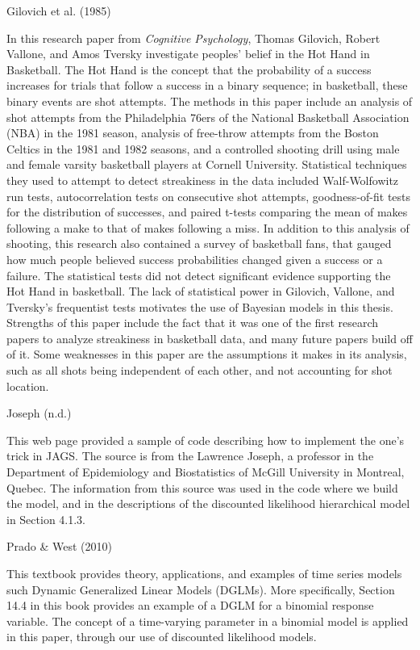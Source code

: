 \documentclass[12pt,twoside]{dukestatscithesis}
\theoremstyle{definition}
\theoremstyle{definition}
\theoremstyle{definition}
\theoremstyle{remark}
\begin{document}
Gilovich et al. (1985)

In this research paper from \emph{Cognitive Psychology}, Thomas
Gilovich, Robert Vallone, and Amos Tversky investigate peoples' belief
in the Hot Hand in Basketball. The Hot Hand is the concept that the
probability of a success increases for trials that follow a success in a
binary sequence; in basketball, these binary events are shot attempts.
The methods in this paper include an analysis of shot attempts from the
Philadelphia 76ers of the National Basketball Association (NBA) in the
1981 season, analysis of free-throw attempts from the Boston Celtics in
the 1981 and 1982 seasons, and a controlled shooting drill using male
and female varsity basketball players at Cornell University. Statistical
techniques they used to attempt to detect streakiness in the data
included Walf-Wolfowitz run tests, autocorrelation tests on consecutive
shot attempts, goodness-of-fit tests for the distribution of successes,
and paired t-tests comparing the mean of makes following a make to that
of makes following a miss. In addition to this analysis of shooting,
this research also contained a survey of basketball fans, that gauged
how much people believed success probabilities changed given a success
or a failure. The statistical tests did not detect significant evidence
supporting the Hot Hand in basketball. The lack of statistical power in
Gilovich, Vallone, and Tversky's frequentist tests motivates the use of
Bayesian models in this thesis. Strengths of this paper include the fact
that it was one of the first research papers to analyze streakiness in
basketball data, and many future papers build off of it. Some weaknesses
in this paper are the assumptions it makes in its analysis, such as all
shots being independent of each other, and not accounting for shot
location.

Joseph (n.d.)

This web page provided a sample of code describing how to implement the
one's trick in JAGS. The source is from the Lawrence Joseph, a professor
in the Department of Epidemiology and Biostatistics of McGill University
in Montreal, Quebec. The information from this source was used in the
code where we build the model, and in the descriptions of the discounted
likelihood hierarchical model in Section 4.1.3.

Prado \& West (2010)

This textbook provides theory, applications, and examples of time series
models such Dynamic Generalized Linear Models (DGLMs). More
specifically, Section 14.4 in this book provides an example of a DGLM
for a binomial response variable. The concept of a time-varying
parameter in a binomial model is applied in this paper, through our use
of discounted likelihood models.
\end{document}
